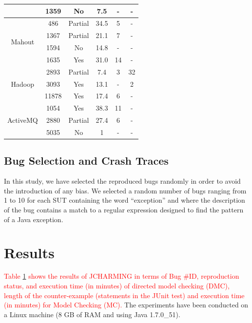 \documentclass[times, doublespace]{smrauth}
\newcommand{\red}[1]{\textcolor{red}{#1}}
\begin{document}
{\begin{table}
\begin{tabular}{c|c|c|c|c|c}
                            & 1359     & No      & 7.5    & -    & - \\ \hline
\multirow{4}{*}{Mahout}     & 486      & Partial & 34.5   & 5    & -        \\
                            & 1367     & Partial & 21.1   & 7  & -       \\
                            & 1594 	   & No 	 & 14.8 	  & -  & -       \\
                            & 1635     & Yes     & 31.0   & 14  & - \\ \hline
\multirow{3}{*}{Hadoop}     & 2893     & Partial & 7.4    & 3  & 32       \\
						    & 3093      & Yes 	   & 13.1     & -     & 2   \\
                            & 11878    & Yes 	 & 17.4     & 6 & - \\  \hline
\multirow{3}{*}{ActiveMQ}   & 1054     & Yes     & 38.3   & 11  & -      \\
						    & 2880      & Partial  & 27.4    & 6    & -       \\
                            & 5035     & No 	 & 1  & -  & - \\  \hline \hline
\end{tabular}


\label{tab:jcharming-results}
\end{table}


\subsection{Bug Selection and Crash Traces}

In this study, we have selected the reproduced bugs randomly
in order to avoid the introduction of any bias. We selected a
random number of bugs ranging from 1 to 10 for each SUT containing the word ``exception'' and where the description of
the bug contains a match to a regular expression designed to find the pattern of a
Java exception.

\section{Results\label{sec:results}}

\red{Table \ref{tab:jcharming-results} shows the results of JCHARMING in terms of Bug
\#ID, reproduction status, and execution time (in minutes) of
directed model checking (DMC), length of the counter-example (statements in the JUnit test) and  execution time (in minutes) for Model Checking (MC).}
The experiments have been conducted on a Linux machine (8
GB of RAM and using Java 1.7.0\_51).

}
\end{document}
